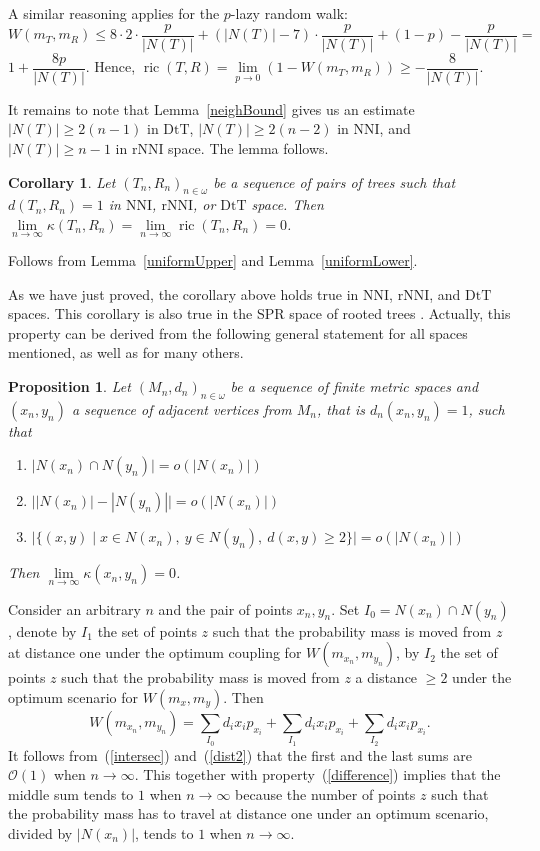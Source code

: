 \documentclass{amsart}
\newtheorem{proposition}[lemma]{Proposition}
\newtheorem{corollary}[lemma]{Corollary}
\theoremstyle{definition}
\newcommand{\nni}{\mathrm{NNI}}
\newcommand{\rnni}{\mathrm{rNNI}}
\newcommand{\mdts}{\mathrm{DtT}}
\newcommand{\ric}{\operatorname{ric}}
\renewcommand{\O}{\mathcal{O}}
\begin{document}
A similar reasoning applies for the $p$-lazy random walk:
\[
W(m_T,m_R)\leq 8 \cdot 2 \cdot \frac{p}{|N(T)|} +
(|N(T)| - 7) \cdot \frac{p}{|N(T)|} + (1-p) - \frac{p}{|N(T)|} =
\]
$1 + \dfrac{8p}{|N(T)|}$.
Hence, $\ric(T,R) = \lim\limits_{p\to0}\left(1 - W(m_T,m_R)\right) \geq - \dfrac{8}{|N(T)|}$.

It remains to note that Lemma~\ref{neighBound} gives us an estimate $|N(T)| \geq 2(n-1)$ in $\mdts$, $|N(T)| \geq 2(n-2)$ in $\nni$, and $|N(T)| \geq n-1$ in $\rnni$ space.
The lemma follows.
\endproof

\begin{corollary}\label{flatInLimDTS}
Let $(T_n,R_n)_{n\in\omega}$ be a sequence of pairs of trees such that $d(T_n,R_n) = 1$ in $\nni$, $\rnni$, or $\mdts$ space.
Then $\lim\limits_{n \to \infty}\kappa(T_n,R_n) = \lim\limits_{n \to \infty}\ric(T_n,R_n) = 0$.
\end{corollary}

\proof
Follows from Lemma~\ref{uniformUpper} and Lemma~\ref{uniformLower}.
\endproof

As we have just proved, the corollary above holds true in $\nni$, $\rnni$, and $\mdts$ spaces.
This corollary is also true in the SPR space of rooted trees \autocite{Whidden2015-es}.
Actually, this property can be derived from the following general statement for all spaces mentioned, as well as for many others.

\begin{proposition}\label{flatInLimGen}
Let $(M_n,d_n)_{n \in \omega}$ be a sequence of finite metric spaces and $(x_n, y_n)$ a sequence of adjacent vertices from $M_n$, that is $d_n(x_n,y_n) = 1$, such that
\begin{enumerate}[(1)]
\item\label{intersec} $\big|N(x_n) \cap N(y_n)\big| = o(|N(x_n)|)$
\item\label{difference} $\big||N(x_n)| - |N(y_n)|\big| = o(|N(x_n)|)$
\item\label{dist2} $\big|\{(x,y) \mid
	x \in N(x_n),~ y \in N(y_n),~ d(x, y) \geq 2\}\big| = o(|N(x_n)|)$
\end{enumerate}

Then $\lim\limits_{n \to \infty} \kappa(x_n, y_n) = 0$.
\end{proposition}

\proof
Consider an arbitrary $n$ and the pair of points $x_n,y_n$.
Set $I_0 = N(x_n) \cap N(y_n)$, denote by $I_1$ the set of points $z$ such that the probability mass is moved from $z$ at distance one under the optimum coupling for $W(m_{x_n},m_{y_n})$, by $I_2$ the set of points $z$ such that the probability mass is moved from $z$ a distance $\geq 2$ under the optimum scenario for $W(m_x,m_y)$.
Then
\[
W(m_{x_n},m_{y_n}) = \sum_{I_0} d_i x_i p_{x_i} + \sum_{I_1} d_i x_i p_{x_i} +
\sum_{I_2} d_i x_i p_{x_i}.
\]
It follows from~(\ref{intersec}) and~(\ref{dist2}) that the first and the last sums are $\O(1)$ when $n\to\infty$.
This together with property~(\ref{difference}) implies that the middle sum tends to $1$ when $n\to\infty$ because the number of points $z$ such that the probability mass has to travel at distance one under an optimum scenario, divided by $|N(x_n)|$, tends to $1$ when $n\to\infty$.
\endproof
\end{document}
